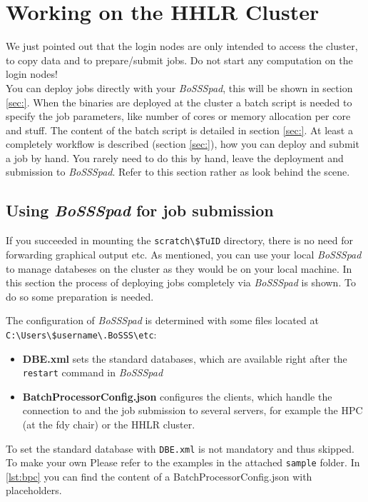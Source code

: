 \documentclass[11pt,twoside,a4paper]{fdyartcl}
\begin{document}
\section{Working on the HHLR Cluster}
\label{sec:WorkingHHLR}
We just pointed out that the login nodes are only intended to access the cluster, to copy data and to prepare/submit jobs. Do not start any computation on the login nodes! \\
You can deploy jobs directly with your \emph{BoSSSpad}, this will be shown in section \ref{sec:}.
When the binaries are deployed at the cluster a batch script is needed to specify the job parameters, like number of cores or memory allocation per core and stuff. The content of the batch script is detailed in section \ref{sec:}.
At least a completely workflow is described (section \ref{sec:}), how you can deploy and submit a job by hand. You rarely need to do this by hand, leave the deployment and submission to \emph{BoSSSpad}. Refer to this section rather as look behind the scene.

\subsection{Using \emph{BoSSSpad} for job submission}
\label{sec:BoSSSpad}

If you succeeded in mounting the \verb|scratch\$TuID| directory, there is no need for forwarding graphical output etc. As mentioned, you can use your local \emph{BoSSSpad} to manage databeses on the cluster as they would be on your local machine. In this section the process of deploying jobs completely via \emph{BoSSSpad} is shown. To do so some preparation is needed.

The configuration of \emph{BoSSSpad} is determined with some files located at \verb|C:\Users\$username\.BoSSS\etc|:
\begin{itemize}
	\item[] \textbf{DBE.xml} sets the standard databases, which are available right after the \verb|restart| command in \emph{BoSSSpad}
	\item[] \textbf{BatchProcessorConfig.json} configures the clients, which handle the connection to and the job submission to several servers, for example the HPC (at the fdy chair) or the HHLR cluster. 
\end{itemize}

To set the standard database with \verb|DBE.xml| is not mandatory and thus skipped.
To make your own Please refer to the examples in the attached \verb|sample| folder.
In \ref{lst:bpc} you can find the content of a BatchProcessorConfig.json with placeholders.
\end{document}
